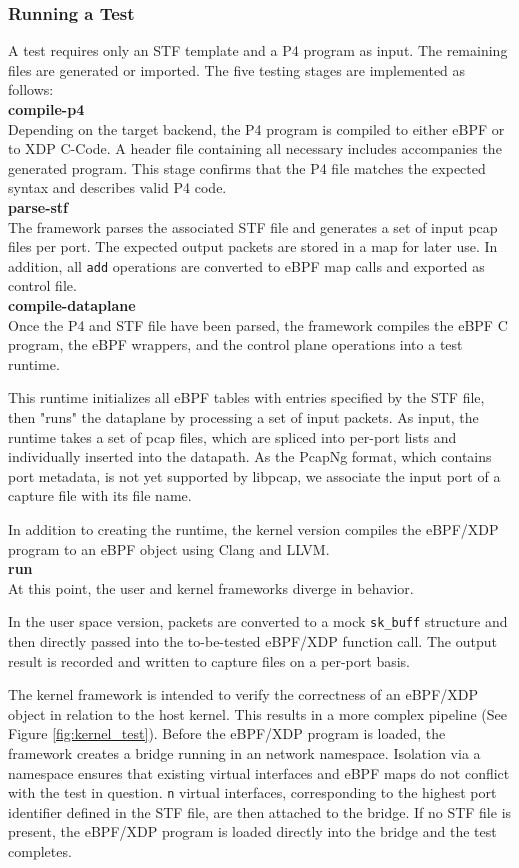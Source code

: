 \subsubsection{Running a Test}
A test requires only an STF template and a P4 program as input. The 
remaining files are generated or imported. The five testing stages are 
implemented as follows:\\

\noindent\textbf{compile-p4}\\
Depending on the target backend, the P4 program is compiled to either eBPF or 
to XDP C-Code. A header file containing all necessary includes accompanies the 
generated program. This stage confirms that the P4 file matches the expected 
syntax and describes valid P4 code.\\ 
\textbf{parse-stf}\\
The framework parses the associated STF file and generates a set of input pcap 
files per port. The expected output packets are stored in a map for later use. 
In addition, all \texttt{add} operations are converted to eBPF map calls and 
exported as control file.\\
\textbf{compile-dataplane}\\
Once the P4 and STF file have been parsed, the framework compiles 
the eBPF C program, the eBPF wrappers, and the control plane operations into a 
test runtime.

This runtime initializes all eBPF tables with entries specified by the STF 
file, then "runs" the dataplane by processing a set of input packets.
As input, the runtime takes a set of pcap files, which are spliced into 
per-port lists and individually inserted into the datapath.
As the PcapNg format, which contains port metadata, is 
not yet supported by libpcap, we associate the input port of a capture file with
its file name.

In addition to creating the runtime, the kernel version compiles the eBPF/XDP 
program to an eBPF object using Clang and LLVM.\\
\textbf{run}\\
At this point, the user and kernel frameworks diverge in behavior.

In the user space version, packets are converted to a mock \texttt{sk\_buff} 
structure and then directly passed into the to-be-tested eBPF/XDP function 
call. The output result is recorded and written to capture files on a per-port 
basis.

The kernel framework is intended to verify the correctness of an 
eBPF/XDP object in relation to the host kernel. This results in a more complex 
pipeline (See Figure \ref{fig:kernel_test}). 
Before the eBPF/XDP program is loaded, the framework creates a bridge running 
in an 
network namespace. Isolation via a namespace ensures that existing 
virtual interfaces and eBPF maps do not conflict with the test in question.
\texttt{n} virtual interfaces, corresponding to 
the highest port identifier defined in the STF file, are then attached to the 
bridge. If no STF file is present, the eBPF/XDP program is loaded directly into 
the bridge and the test completes.

